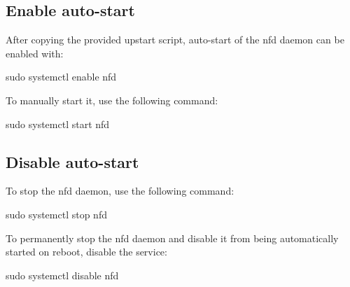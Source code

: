 \subsection*{Enable auto-\/start }

After copying the provided upstart script, auto-\/start of the {\ttfamily nfd} daemon can be enabled with\+: \begin{DoxyVerb}sudo systemctl enable nfd
\end{DoxyVerb}


To manually start it, use the following command\+: \begin{DoxyVerb}sudo systemctl start nfd
\end{DoxyVerb}


\subsection*{Disable auto-\/start }

To stop the {\ttfamily nfd} daemon, use the following command\+: \begin{DoxyVerb}sudo systemctl stop nfd
\end{DoxyVerb}


To permanently stop the {\ttfamily nfd} daemon and disable it from being automatically started on reboot, disable the service\+: \begin{DoxyVerb}sudo systemctl disable nfd \end{DoxyVerb}
 